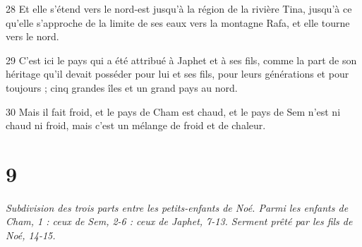 \par 28 Et elle s'étend vers le nord-est jusqu'à la région de la rivière Tina, jusqu'à ce qu'elle s'approche de la limite de ses eaux vers la montagne Rafa, et elle tourne vers le nord.
\par 29 C'est ici le pays qui a été attribué à Japhet et à ses fils, comme la part de son héritage qu'il devait posséder pour lui et ses fils, pour leurs générations et pour toujours ; cinq grandes îles et un grand pays au nord.
\par 30 Mais il fait froid, et le pays de Cham est chaud, et le pays de Sem n'est ni chaud ni froid, mais c'est un mélange de froid et de chaleur.

\chapter{9}

\par \textit{Subdivision des trois parts entre les petits-enfants de Noé. Parmi les enfants de Cham, 1 : ceux de Sem, 2-6 : ceux de Japhet, 7-13. Serment prêté par les fils de Noé, 14-15.}

